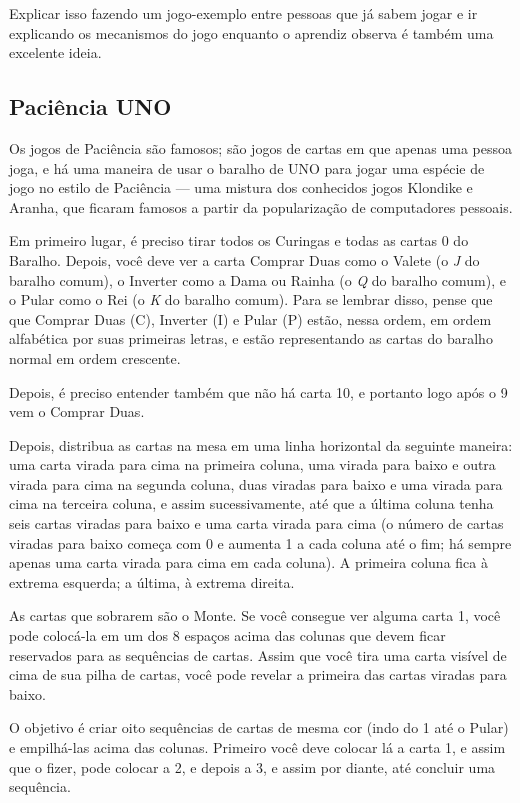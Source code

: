 Explicar isso fazendo um jogo-exemplo entre pessoas que já sabem jogar e ir explicando os mecanismos do jogo enquanto o aprendiz observa é também uma excelente ideia.

\subsection{Paciência UNO}

Os jogos de Paciência são famosos; são jogos de cartas em que apenas uma pessoa joga, e há uma maneira de usar o baralho de UNO para jogar uma espécie de jogo no estilo de Paciência --- uma mistura dos conhecidos jogos Klondike e Aranha, que ficaram famosos a partir da popularização de computadores pessoais.

Em primeiro lugar, é preciso tirar todos os Curingas e todas as cartas 0 do Baralho. Depois, você deve ver a carta Comprar Duas como o Valete (o \emph{J} do baralho comum), o Inverter como a Dama ou Rainha (o \emph{Q} do baralho comum), e o Pular como o Rei (o \emph{K} do baralho comum). Para se lembrar disso, pense que que Comprar Duas (C), Inverter (I) e Pular (P) estão, nessa ordem, em ordem alfabética por suas primeiras letras, e estão representando as cartas do baralho normal em ordem crescente.

Depois, é preciso entender também que não há carta 10, e portanto logo após o 9 vem o Comprar Duas.

Depois, distribua as cartas na mesa em uma linha horizontal da seguinte maneira: uma carta virada para cima na primeira coluna, uma virada para baixo e outra virada para cima na segunda coluna, duas viradas para baixo e uma virada para cima na terceira coluna, e assim sucessivamente, até que a última coluna tenha seis cartas viradas para baixo e uma carta virada para cima (o número de cartas viradas para baixo começa com 0 e aumenta 1 a cada coluna até o fim; há sempre apenas uma carta virada para cima em cada coluna). A primeira coluna fica à extrema esquerda; a última, à extrema direita.

As cartas que sobrarem são o Monte. Se você consegue ver alguma carta 1, você pode colocá-la em um dos 8 espaços acima das colunas que devem ficar reservados para as sequências de cartas. Assim que você tira uma carta visível de cima de sua pilha de cartas, você pode revelar a primeira das cartas viradas para baixo.

O objetivo é criar oito sequências de cartas de mesma cor (indo do 1 até o Pular) e empilhá-las acima das colunas. Primeiro você deve colocar lá a carta 1, e assim que o fizer, pode colocar a 2, e depois a 3, e assim por diante, até concluir uma sequência.

